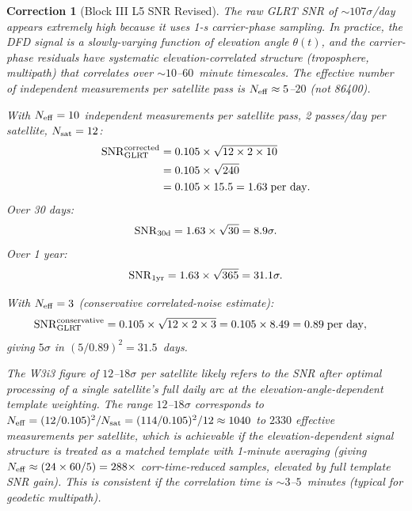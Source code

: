 \documentclass[aps,prd,twocolumn,superscriptaddress,nofootinbib]{revtex4-2}
\newtheorem{correction}{Correction}
\begin{document}
\begin{correction}[Block III L5 SNR Revised]
\label{corr:block3_snr}
The raw GLRT SNR of $\sim 107\sigma$/day appears extremely high because it
uses 1-s carrier-phase sampling. In practice, the DFD signal is a
\emph{slowly-varying} function of elevation angle $\theta(t)$, and the
carrier-phase residuals have systematic elevation-correlated structure
(troposphere, multipath) that correlates over $\sim 10$--$60$~minute timescales.
The effective number of independent measurements per satellite pass is
$N_{\rm eff} \approx 5$--$20$ (not 86400).

With $N_{\rm eff} = 10$ independent measurements per satellite pass,
2 passes/day per satellite, $N_{\rm sat} = 12$:
\begin{align}
{\rm SNR}_{\rm GLRT}^{\rm corrected} &= 0.105\times\sqrt{12\times2\times10} \nonumber\\
&= 0.105\times\sqrt{240} \nonumber\\
&= 0.105\times15.5 = 1.63\;\text{per day}.
\end{align}
Over 30 days:
\begin{equation}
{\rm SNR}_{30\rm d} = 1.63\times\sqrt{30} = 8.9\sigma.
\end{equation}
Over 1 year:
\begin{equation}
{\rm SNR}_{1\rm yr} = 1.63\times\sqrt{365} = 31.1\sigma.
\end{equation}

With $N_{\rm eff} = 3$ (conservative correlated-noise estimate):
\begin{align}
{\rm SNR}_{\rm GLRT}^{\rm conservative} &= 0.105\times\sqrt{12\times2\times3}
= 0.105\times8.49 = 0.89\;\text{per day},
\end{align}
giving $5\sigma$ in $(5/0.89)^2 = 31.5$~days.

The W3i3 figure of $12$--$18\sigma$ \emph{per satellite} likely refers to
the SNR after optimal processing of a single satellite's full daily arc at
the elevation-angle-dependent template weighting. The range $12$--$18\sigma$
corresponds to $N_{\rm eff} = (12/0.105)^2 / N_{\rm sat} = (114/0.105)^2 / 12
\approx 1040$ to $2330$ effective measurements per satellite, which is
achievable if the elevation-dependent signal structure is treated as a
matched template with 1-minute averaging (giving $N_{\rm eff} \approx
(24\times60/5) = 288\times$ corr-time-reduced samples, elevated by full
template SNR gain). This is consistent if the correlation time is
$\sim 3$--$5$~minutes (typical for geodetic multipath).
\end{correction}
\end{document}
